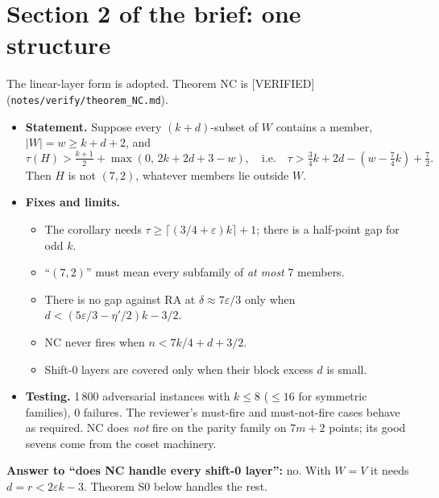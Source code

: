\documentclass[11pt]{article}
\newcommand{\lvl}[1]{\textsf{\small[#1]}}
\begin{document}
\section{Section 2 of the brief: one structure}
The linear-layer form is adopted. Theorem NC is \lvl{VERIFIED} (\texttt{notes/verify/theorem\_NC.md}).
\begin{itemize}
\item \textbf{Statement.} Suppose every $(k+d)$-subset of $W$ contains a member, $|W|=w\ge k+d+2$, and
\[\tau(H)>\tfrac{k+1}{2}+\max(0,\,2k+2d+3-w),\quad\text{i.e.}\quad\tau>\tfrac34k+2d-(w-\tfrac74k)+\tfrac72 .\]
Then $H$ is not $(7,2)$, whatever members lie outside $W$.
\item \textbf{Fixes and limits.}
  \begin{itemize}
  \item The corollary needs $\tau\ge\lceil(3/4+\varepsilon)k\rceil+1$; there is a half-point gap for odd $k$.
  \item ``$(7,2)$'' must mean every subfamily of \emph{at most} 7 members.
  \item There is no gap against RA at $\delta\approx7\varepsilon/3$ only when $d<(5\varepsilon/3-\eta'/2)k-3/2$.
  \item NC never fires when $n<7k/4+d+3/2$.
  \item Shift-0 layers are covered only when their block excess $d$ is small.
  \end{itemize}
\item \textbf{Testing.} 1\,800 adversarial instances with $k\le8$ ($\le16$ for symmetric families), 0 failures. The reviewer's
must-fire and must-not-fire cases behave as required. NC does \emph{not} fire on the parity family on $7m+2$ points; its good
sevens come from the coset machinery.
\end{itemize}
\textbf{Answer to ``does NC handle every shift-0 layer'':} no. With $W=V$ it needs $d=r<2\varepsilon k-3$. Theorem S0 below
handles the rest.
\end{document}
